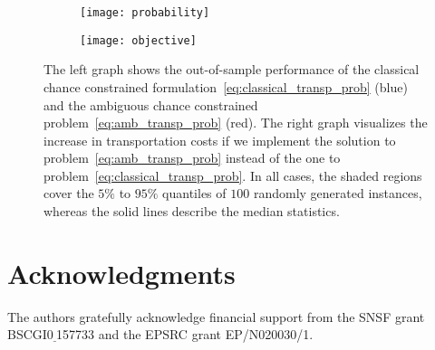 \documentclass[nonblindrev]{informs2017}
\newcommand{\1}[1]{\mathds{1}{\left(#1\right)}}
\begin{document}
\begin{figure}[tb]
\begin{subfigure}{.5\textwidth}
\begin{center}
\texttt{[image: probability]}
\end{center}
\end{subfigure}%
\begin{subfigure}{.5\textwidth}
\begin{center}
\texttt{[image: objective]}
\end{center}
\end{subfigure}%
\vspace{0.2cm}
\caption{{\textnormal{The left graph shows the out-of-sample performance of the classical chance constrained formulation~\eqref{eq:classical_transp_prob} (blue) and the ambiguous chance constrained problem~\eqref{eq:amb_transp_prob} (red). The right graph visualizes the increase in transportation costs if we implement the solution to problem~\eqref{eq:amb_transp_prob} instead of the one to problem~\eqref{eq:classical_transp_prob}. In all cases, the shaded regions cover the $5\%$ to $95\%$ quantiles of $100$ randomly generated instances, whereas the solid lines describe the median statistics.}} \label{fig:probability}}
\end{figure}

\section*{Acknowledgments}

The authors gratefully acknowledge financial support from the SNSF grant BSCGI0$\underline{~}$157733 and the EPSRC grant EP/N020030/1.

\newpage


\end{document}
